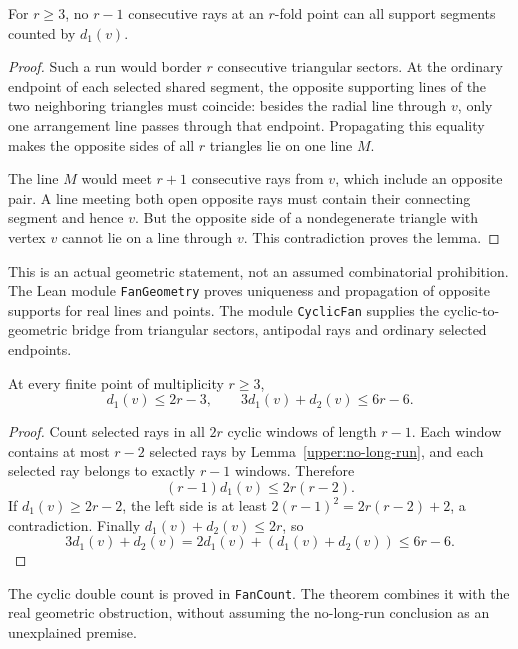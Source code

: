 \begin{lemma}
\label{upper:no-long-run}
For $r\ge3$, no $r-1$ consecutive rays at an $r$-fold point can all support segments counted by $d_1(v)$.
\end{lemma}

\begin{proof}
Such a run would border $r$ consecutive triangular sectors. At the ordinary endpoint of each selected shared segment, the opposite supporting lines of the two neighboring triangles must coincide: besides the radial line through $v$, only one arrangement line passes through that endpoint. Propagating this equality makes the opposite sides of all $r$ triangles lie on one line $M$.

The line $M$ would meet $r+1$ consecutive rays from $v$, which include an opposite pair. A line meeting both open opposite rays must contain their connecting segment and hence $v$. But the opposite side of a nondegenerate triangle with vertex $v$ cannot lie on a line through $v$. This contradiction proves the lemma.
\end{proof}

This is an actual geometric statement, not an assumed combinatorial prohibition. The Lean module \texttt{FanGeometry} proves uniqueness and propagation of opposite supports for real lines and points. The module \texttt{CyclicFan} supplies the cyclic-to-geometric bridge from triangular sectors, antipodal rays and ordinary selected endpoints.

\begin{proposition}
\label{upper:fan-budget}
At every finite point of multiplicity $r\ge3$,
\begin{equation}
 d_1(v)\le2r-3,\qquad 3d_1(v)+d_2(v)\le6r-6.
 \label{upper:local-fan-budget}
\end{equation}
\end{proposition}

\begin{proof}
Count selected rays in all $2r$ cyclic windows of length $r-1$. Each window contains at most $r-2$ selected rays by Lemma~\ref{upper:no-long-run}, and each selected ray belongs to exactly $r-1$ windows. Therefore
\[
 (r-1)d_1(v)\le2r(r-2).
\]
If $d_1(v)\ge2r-2$, the left side is at least $2(r-1)^2=2r(r-2)+2$, a contradiction. Finally $d_1(v)+d_2(v)\le2r$, so
\[
 3d_1(v)+d_2(v)=2d_1(v)+(d_1(v)+d_2(v))\le6r-6.
\]
\end{proof}

The cyclic double count is proved in \texttt{FanCount}. The theorem  combines it with the real geometric obstruction, without assuming the no-long-run conclusion as an unexplained premise.


